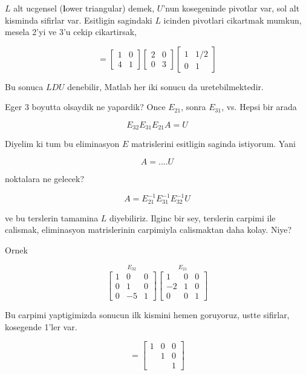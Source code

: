 \documentclass[12pt,fleqn]{article}\usepackage{../common}
\begin{document}
$L$ alt ucgensel (\textbf{l}ower triangular) demek, $U$'nun kosegeninde
pivotlar var, sol alt kisminda sifirlar var. Esitligin sagindaki $L$ icinden
pivotlari cikartmak mumkun, mesela 2'yi ve 3'u cekip cikartirsak, 

\[ 
=
\left[\begin{array}{rr}
1 & 0 \\ 4 & 1
\end{array}\right]
\left[\begin{array}{rr}
2 & 0 \\ 0 & 3
\end{array}\right]
\left[\begin{array}{rr}
1 & 1/2 \\ 0 & 1
\end{array}\right]
 \]

Bu sonuca $LDU$ denebilir, Matlab her iki sonucu da uretebilmektedir. 

Eger 3 boyutta olsaydik ne yapardik? Once $E_{21}$, sonra $E_{31}$,
vs. Hepsi bir arada

\[ E_{32}E_{31}E_{21} A = U\]

Diyelim ki tum bu eliminasyon $E$ matrislerini esitligin saginda
istiyorum. Yani

\[ A = ....U \]

noktalara ne gelecek? 

\[ A = E_{21} ^{-1}  E_{31} ^{-1}  E_{32} ^{-1}  U\]

ve bu terslerin tamamina $L$ diyebiliriz. Ilginc bir sey, terslerin
carpimi ile calismak, eliminasyon matrislerinin carpimiyla calismaktan daha
kolay. Niye?

Ornek

\[ 
\stackrel{E_{32}}{
\left[\begin{array}{rrr}
1 & 0 & 0 \\
0 & 1 & 0 \\
0 & -5 & 1
\end{array}\right] }
\stackrel{{E_{21}}}{
\left[\begin{array}{rrr}
1 & 0 & 0 \\
-2 & 1 & 0 \\
0 & 0 & 1
\end{array}\right]}
 \]

Bu carpimi yaptigimizda sonucun ilk kismini hemen goruyoruz, ustte
sifirlar, kosegende 1'ler var.

\[ = 
\left[\begin{array}{rrr}
1 & 0 & 0 \\
 & 1 & 0 \\
 &  & 1
\end{array}\right]
 \]
\end{document}
